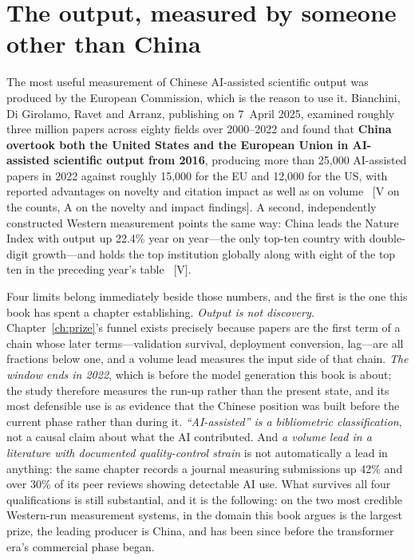 \section{The output, measured by someone other than China}
\label{sec:china-ai4s-output}

The most useful measurement of Chinese AI-assisted scientific output was produced by the European Commission, which is the reason to use it. Bianchini, Di Girolamo, Ravet and Arranz, publishing on 7~April 2025, examined roughly three million papers across eighty fields over 2000--2022 and found that \textbf{China overtook both the United States and the European Union in AI-assisted scientific output from 2016}, producing more than 25{,}000 AI-assisted papers in 2022 against roughly 15{,}000 for the EU and 12{,}000 for the US, with reported advantages on novelty and citation impact as well as on volume~\cite{ec-ai4s-biblio} [V on the counts, A on the novelty and impact findings]. A second, independently constructed Western measurement points the same way: China leads the Nature Index with output up 22.4\% year on year---the only top-ten country with double-digit growth---and holds the top institution globally along with eight of the top ten in the preceding year's table~\cite{nature-index-2026,nature-index-2025} [V].

Four limits belong immediately beside those numbers, and the first is the one this book has spent a chapter establishing. \emph{Output is not discovery.} Chapter~\ref{ch:prize}'s funnel exists precisely because papers are the first term of a chain whose later terms---validation survival, deployment conversion, lag---are all fractions below one, and a volume lead measures the input side of that chain. \emph{The window ends in 2022}, which is before the model generation this book is about; the study therefore measures the run-up rather than the present state, and its most defensible use is as evidence that the Chinese position was built before the current phase rather than during it. \emph{``AI-assisted'' is a bibliometric classification}, not a causal claim about what the AI contributed. And \emph{a volume lead in a literature with documented quality-control strain} is not automatically a lead in anything: the same chapter records a journal measuring submissions up 42\% and over 30\% of its peer reviews showing detectable AI use. What survives all four qualifications is still substantial, and it is the following: on the two most credible Western-run measurement systems, in the domain this book argues is the largest prize, the leading producer is China, and has been since before the transformer era's commercial phase began.

